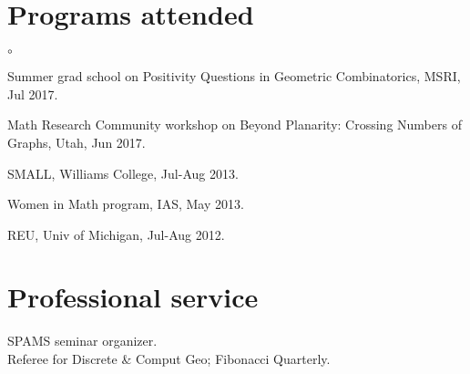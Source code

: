 \documentclass[margin,line]{res}
\newenvironment{list2}{
  \begin{list}{$\circ$}{%
      \setlength{\itemsep}{0in}
      \setlength{\parsep}{0in} \setlength{\parskip}{0in}
      \setlength{\topsep}{0in} \setlength{\partopsep}{0in}
      \setlength{\leftmargin}{0.2in}}}{\end{list}}
\begin{document}
\begin{resume}
\section{\sc Programs attended}
\begin{list2}
\item[] Summer grad school on Positivity Questions in Geometric Combinatorics, MSRI, Jul 2017.
\item[] Math Research Community workshop on Beyond Planarity: Crossing Numbers of Graphs, Utah, Jun 2017.
\item[] SMALL, Williams College, Jul-Aug 2013.
\item[] Women in Math program, IAS, May 2013.
\item[] REU, Univ of Michigan, Jul-Aug 2012.
\end{list2}
\section{\sc Professional service}
SPAMS seminar organizer.
\\Referee for Discrete \& Comput Geo; Fibonacci Quarterly. 
\thispagestyle{empty}


\end{resume}
\end{document}
